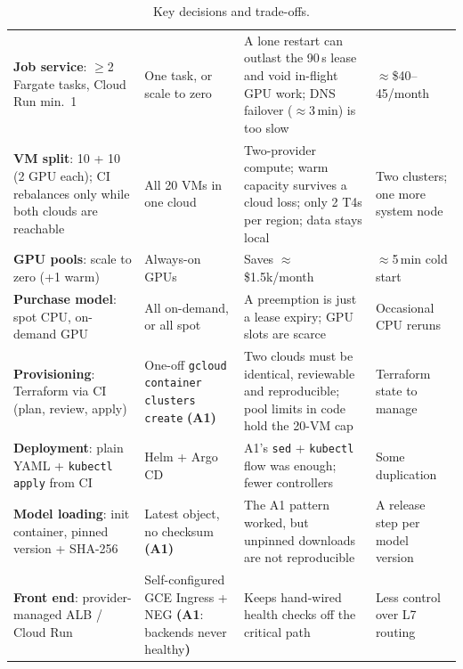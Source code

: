 \documentclass[10pt,a4paper]{article}
\begin{document}
\begin{table}[H]
\begin{tabularx}{\linewidth}{@{}L{3.75cm}L{3.15cm}YL{2.75cm}@{}}
\textbf{Job service}: $\geq$2 Fargate tasks, Cloud Run min.\ 1 & One task, or scale to zero & A lone restart can outlast the 90\,s lease and void in-flight GPU work; DNS failover ($\approx$3\,min) is too slow & $\approx$\$40--45/month~\cite{fargate-pricing} \\
\textbf{VM split}: 10 + 10 (2 GPU each); CI rebalances only while both clouds are reachable & All 20 VMs in one cloud & Two-provider compute; warm capacity survives a cloud loss; only 2 T4s per region; data stays local & Two clusters; one more system node \\
\textbf{GPU pools}: scale to zero (+1 warm) & Always-on GPUs & Saves $\approx$\$1.5k/month & $\approx$5\,min cold start \\
\textbf{Purchase model}: spot CPU, on-demand GPU & All on-demand, or all spot & A preemption is just a lease expiry; GPU slots are scarce & Occasional CPU reruns \\
\textbf{Provisioning}: Terraform via CI (plan, review, apply) & One-off \texttt{gcloud container clusters create} \textbf{(A1)} & Two clouds must be identical, reviewable and reproducible; pool limits in code hold the 20-VM cap & Terraform state to manage \\
\textbf{Deployment}: plain YAML + \texttt{kubectl apply} from CI & Helm + Argo CD & A1's \texttt{sed} + \texttt{kubectl} flow was enough; fewer controllers & Some duplication \\
\textbf{Model loading}: init container, pinned version + SHA-256 & Latest object, no checksum \textbf{(A1)} & The A1 pattern worked, but unpinned downloads are not reproducible & A release step per model version \\
\textbf{Front end}: provider-managed ALB / Cloud Run & Self-configured GCE Ingress + NEG \textbf{(A1}: backends never healthy\textbf{)} & Keeps hand-wired health checks off the critical path & Less control over L7 routing \\
\bottomrule
\end{tabularx}
\caption{Key decisions and trade-offs.}
\end{table}
\end{document}
